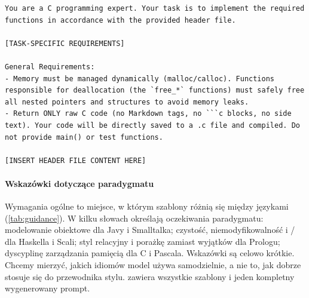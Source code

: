 \begin{lstlisting}[style=prompt,caption={Szablon promptu początkowego dla C (\file{C/README.md}).},label={lst:prompt-initial}]
You are a C programming expert. Your task is to implement the required functions in accordance with the provided header file.

[TASK-SPECIFIC REQUIREMENTS]

General Requirements:
- Memory must be managed dynamically (malloc/calloc). Functions responsible for deallocation (the `free_*` functions) must safely free all nested pointers and structures to avoid memory leaks.
- Return ONLY raw C code (no Markdown tags, no ```c blocks, no side text). Your code will be directly saved to a .c file and compiled. Do not provide main() or test functions.

[INSERT HEADER FILE CONTENT HERE]
\end{lstlisting}

\paragraph{Wskazówki dotyczące paradygmatu} Wymagania ogólne to miejsce, w którym szablony różnią się
między językami (\cref{tab:guidance}). W kilku słowach określają oczekiwania paradygmatu:
modelowanie obiektowe dla Javy i Smalltalka; czystość, niemodyfikowalność i
/ dla Haskella i Scali; styl relacyjny i porażkę zamiast wyjątków dla
Prologu; dyscyplinę zarządzania pamięcią dla C i Pascala. Wskazówki są celowo krótkie. Chcemy
mierzyć, jakich idiomów model używa samodzielnie, a nie to, jak dobrze stosuje się do przewodnika
stylu.  zawiera wszystkie szablony i jeden kompletny wygenerowany prompt.

